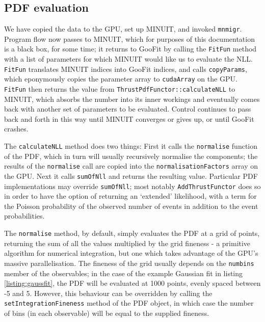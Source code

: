 \documentclass[12pt,pdflatex]{article}
\begin{document}
\subsection{PDF evaluation}

We have copied the data to the GPU, set up MINUIT, and invoked \texttt{mnmigr}. 
Program flow now passes to MINUIT, which for purposes of this documentation
is a black box, for some time; it returns to GooFit by calling the \texttt{FitFun}
method with a list of parameters for which MINUIT would like us to evaluate the NLL. 
\texttt{FitFun} translates MINUIT indices into GooFit indices, and calls \texttt{copyParams}, 
which eponymously copies the parameter array to \texttt{cudaArray} on the GPU. 
\texttt{FitFun} then returns the value from \texttt{ThrustPdfFunctor::calculateNLL}
to MINUIT, which absorbs the number into its inner workings and eventually comes
back with another set of parameters to be evaluated. Control continues to pass back
and forth in this way until MINUIT converges or gives up, or until GooFit crashes. 

The \texttt{calculateNLL} method does two things: First it calls the \texttt{normalise}
function of the PDF, which in turn will usually recursively normalise the components;
the results of the \texttt{normalise} call are copied into the \texttt{normalisationFactors}
array on the GPU. Next it calls \texttt{sumOfNll} and returns the resulting value.
Particular PDF implementations may override \texttt{sumOfNll}; most notably
\texttt{AddThrustFunctor} does so in order to have the option of returning
an `extended' likelihood, with a term for the Poisson probability of the observed
number of events in addition to the event probabilities. 

The \texttt{normalise} method, by default, simply evaluates the PDF at a grid of points,
returning the sum of all the values multiplied by the grid fineness - a primitive algorithm
for numerical integration, but one which takes advantage of the GPU's massive parallelisation.
The fineness of the grid usually depends on the \texttt{numbins} member of the observables; in
the case of the example Gaussian fit in listing \ref{listing:gaussfit}, the PDF will be evaluated at 1000 points, evenly
spaced between -5 and 5. However, this behaviour can be overridden by calling the 
\texttt{setIntegrationFineness} method of the PDF object, in which case the number of bins
(in each observable) will be equal to the supplied fineness. 
\end{document}
